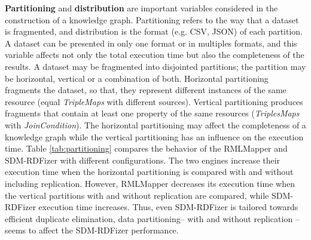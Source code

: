 \noindent \textbf{Partitioning} and \textbf{distribution} are important variables considered in the construction of a knowledge graph. Partitioning refers to the way that a dataset is fragmented, and distribution is the format (e.g. CSV, JSON) of each partition. A dataset can be presented in only one format or in multiples formats, and this variable affects not only the total execution time but also the completeness of the results. A dataset may be fragmented into disjointed partitions; the partition may be horizontal, vertical or a combination of both. Horizontal partitioning fragments the dataset, so that, they represent different instances of the same resource (equal \textit{TripleMaps} with different sources). Vertical partitioning produces fragments that contain at least one property of the same resources (\textit{TriplesMaps} with \textit{JoinCondition}). The horizontal partitioning may affect the completeness of a knowledge graph while the vertical partitioning has an influence on the execution time. Table \ref{tab:partitioning} compares the behavior of the RMLMapper and SDM-RDFizer with different configurations. The two engines increase their execution time when the horizontal partitioning is compared with and without including replication. However, RMLMapper decreases its execution time when the vertical partitions with and without replication are compared, while SDM-RDFizer execution time increases.  Thus, even SDM-RDFizer is tailored towards efficient duplicate elimination, data partitioning-- with and without replication -- seems to affect the SDM-RDFizer performance. \newline

